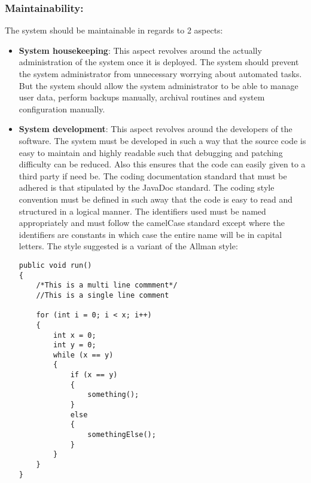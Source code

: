 \vspace{0.1in}

\vspace{0.2in}
\newpage
\subsubsection{Maintainability:}

\begin{flushleft}
The system should be maintainable in regards to 2 aspects: 
\begin{itemize}
\item \textbf{System housekeeping}: This aspect revolves around the actually administration of the system once it is deployed. The system should prevent the system administrator from unnecessary worrying about automated tasks. But the system should allow the system administrator to be able to manage user data, perform backups manually, archival routines and system configuration manually. 
\item \textbf{System development}: This aspect revolves around the developers of the software. The system must be developed in such a way that the source code is easy to maintain and highly readable such that debugging and patching difficulty can be reduced. Also this ensures that the code can easily given to a third party if need be. The coding documentation standard that must be adhered is that stipulated by the JavaDoc standard. The coding style convention must be defined in such away that the code is easy to read and structured in a logical manner. The identifiers used must be named appropriately and must follow the camelCase standard except where the identifiers are constants in which case the entire name will be in capital letters. The style suggested is a variant of the Allman style:
\begin{lstlisting}
public void run()
{
	/*This is a multi line commment*/
	//This is a single line comment
	
	for (int i = 0; i < x; i++)
	{
		int x = 0;
		int y = 0;
		while (x == y)
		{
			if (x == y)
			{
			    something();			    
			}
			else
			{
				somethingElse();
			}
		}
	}
}
\end{lstlisting}
\end{itemize}


\end{flushleft}

\vspace{0.1in}